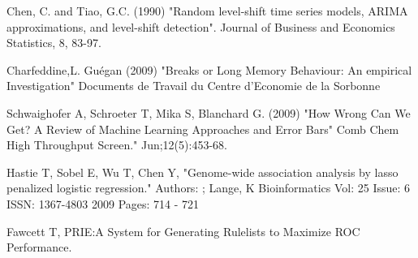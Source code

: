 \documentclass[12pt]{article}
\begin{document}
\begin{thebibliography}{1}
Chen, C. and Tiao, G.C. (1990) "Random level-shift time series models,
ARIMA approximations, and level-shift detection". Journal of Business
and Economics Statistics, 8, 83-97.

Charfeddine,L. Guégan (2009) "Breaks or Long Memory Behaviour: An empirical Investigation" Documents de Travail du Centre d’Economie de la Sorbonne

Schwaighofer A, Schroeter T, Mika S, Blanchard G. (2009) "How Wrong Can We Get? A Review of Machine Learning Approaches and Error Bars" Comb Chem High Throughput Screen."  Jun;12(5):453-68.

Hastie T, Sobel E, Wu T, Chen Y, "Genome-wide association analysis by lasso penalized logistic regression." Authors: ; Lange, K Bioinformatics Vol: 25 Issue: 6 ISSN: 1367-4803 2009 Pages: 714 - 721

Fawcett T, PRIE:A System for Generating Rulelists to Maximize ROC Performance.


\end{thebibliography}
\end{document}
